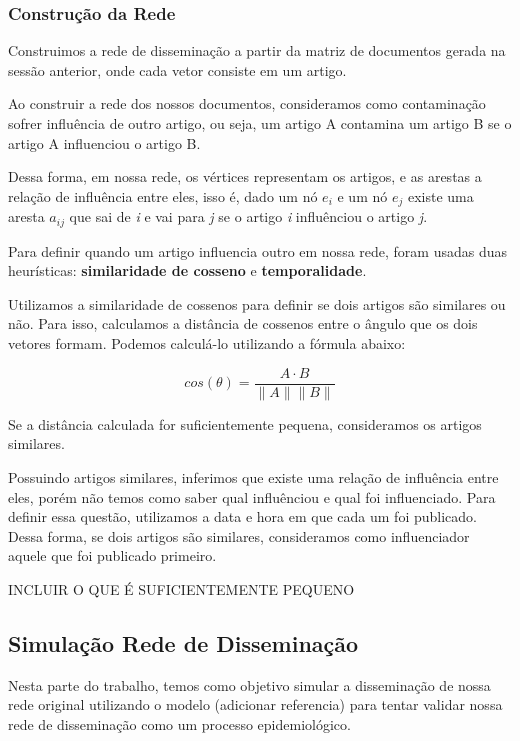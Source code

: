 \documentclass[a4paper,12pt]{article}
\begin{document}
\subsubsection{Construção da Rede}

 Construimos a rede de disseminação a partir da matriz de documentos gerada na sessão anterior, onde cada vetor consiste em um artigo.
 
 Ao construir a rede dos nossos documentos,
 consideramos como contaminação sofrer influência de outro artigo, ou seja, um artigo A contamina um artigo B se o artigo A influenciou o
 artigo B.
 
 Dessa forma, em nossa rede, os vértices representam os artigos, e as arestas a relação de influência entre eles, isso é, dado um nó $e_{i}$ e um nó
 $e_{j}$ existe uma aresta $a_{ij}$ que sai de \textit{i} e vai para \textit{j} se o artigo \textit{i} influênciou o artigo \textit{j}.
 
 Para definir quando um artigo influencia outro em nossa rede, foram usadas duas heurísticas: \textbf{similaridade de cosseno} e 
 \textbf{temporalidade}.
 
 Utilizamos a similaridade de cossenos para definir se dois artigos são similares ou não. Para isso, calculamos a distância de cossenos
 entre o ângulo que os dois vetores formam. Podemos calculá-lo utilizando a fórmula abaixo:
 
 $$ cos(\theta) = \dfrac{A \cdot B}{\parallel A\parallel \parallel B \parallel} $$
 
 Se a distância calculada for suficientemente pequena, consideramos os artigos similares.
 
 Possuindo artigos similares, inferimos que existe uma relação de influência entre eles, 
 porém não temos como saber qual influênciou e qual foi influenciado. Para definir essa questão, utilizamos a data e hora em que
 cada um foi publicado. Dessa forma, se dois artigos são similares, consideramos como influenciador aquele que foi publicado primeiro. 

 
 INCLUIR O QUE É SUFICIENTEMENTE PEQUENO 
 
\subsection{Simulação Rede de Disseminação}

Nesta parte do trabalho, temos como objetivo simular a disseminação de nossa rede original utilizando o modelo (adicionar referencia)
para tentar validar nossa rede de disseminação como um processo epidemiológico.
\end{document}
